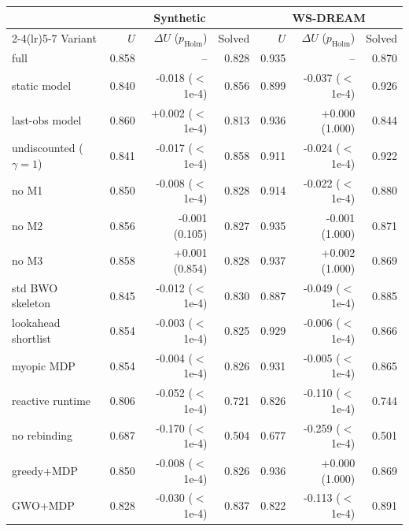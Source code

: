 \begin{tabular}{lrrrrrr}\toprule
 & \multicolumn{3}{c}{Synthetic} & \multicolumn{3}{c}{WS-DREAM}\\\cmidrule(lr){2-4}\cmidrule(lr){5-7}
Variant & $U$ & $\Delta U$ ($p_\mathrm{Holm}$) & Solved & $U$ & $\Delta U$ ($p_\mathrm{Holm}$) & Solved\\\midrule
full & 0.858 & -- & 0.828 & 0.935 & -- & 0.870\\
static model & 0.840 & -0.018 ($<$1e-4) & 0.856 & 0.899 & -0.037 ($<$1e-4) & 0.926\\
last-obs model & 0.860 & +0.002 ($<$1e-4) & 0.813 & 0.936 & +0.000 (1.000) & 0.844\\
undiscounted ($\gamma{=}1$) & 0.841 & -0.017 ($<$1e-4) & 0.858 & 0.911 & -0.024 ($<$1e-4) & 0.922\\
no M1 & 0.850 & -0.008 ($<$1e-4) & 0.828 & 0.914 & -0.022 ($<$1e-4) & 0.880\\
no M2 & 0.856 & -0.001 (0.105) & 0.827 & 0.935 & -0.001 (1.000) & 0.871\\
no M3 & 0.858 & +0.001 (0.854) & 0.828 & 0.937 & +0.002 (1.000) & 0.869\\
std BWO skeleton & 0.845 & -0.012 ($<$1e-4) & 0.830 & 0.887 & -0.049 ($<$1e-4) & 0.885\\
lookahead shortlist & 0.854 & -0.003 ($<$1e-4) & 0.825 & 0.929 & -0.006 ($<$1e-4) & 0.866\\
myopic MDP & 0.854 & -0.004 ($<$1e-4) & 0.826 & 0.931 & -0.005 ($<$1e-4) & 0.865\\
reactive runtime & 0.806 & -0.052 ($<$1e-4) & 0.721 & 0.826 & -0.110 ($<$1e-4) & 0.744\\
no rebinding & 0.687 & -0.170 ($<$1e-4) & 0.504 & 0.677 & -0.259 ($<$1e-4) & 0.501\\
greedy+MDP & 0.850 & -0.008 ($<$1e-4) & 0.826 & 0.936 & +0.000 (1.000) & 0.869\\
GWO+MDP & 0.828 & -0.030 ($<$1e-4) & 0.837 & 0.822 & -0.113 ($<$1e-4) & 0.891\\
\bottomrule
\end{tabular}